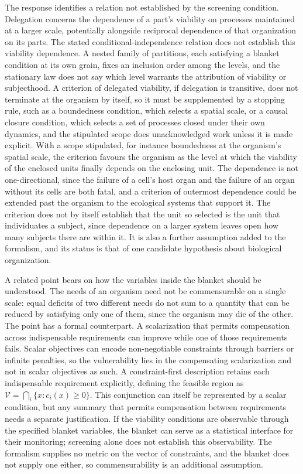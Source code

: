 \documentclass[11pt]{article}
\theoremstyle{definition}
\begin{document}
The response identifies a relation not established by the screening condition. Delegation concerns the dependence of a part's viability on processes maintained at a larger scale, potentially alongside reciprocal dependence of that organization on its parts. The stated conditional-independence relation does not establish this viability dependence. A nested family of partitions, each satisfying a blanket condition at its own grain, fixes an inclusion order among the levels, and the stationary law does not say which level warrants the attribution of viability or subjecthood. A criterion of delegated viability, if delegation is transitive, does not terminate at the organism by itself, so it must be supplemented by a stopping rule, such as a boundedness condition, which selects a spatial scale, or a causal closure condition, which selects a set of processes closed under their own dynamics, and the stipulated scope does unacknowledged work unless it is made explicit. With a scope stipulated, for instance boundedness at the organism's spatial scale, the criterion favours the organism as the level at which the viability of the enclosed units finally depends on the enclosing unit. The dependence is not one-directional, since the failure of a cell's host organ and the failure of an organ without its cells are both fatal, and a criterion of outermost dependence could be extended past the organism to the ecological systems that support it. The criterion does not by itself establish that the unit so selected is the unit that individuates a subject, since dependence on a larger system leaves open how many subjects there are within it. It is also a further assumption added to the formalism, and its status is that of one candidate hypothesis about biological organization.

A related point bears on how the variables inside the blanket should be understood. The needs of an organism need not be commensurable on a single scale: equal deficits of two different needs do not sum to a quantity that can be reduced by satisfying only one of them, since the organism may die of the other. The point has a formal counterpart. A scalarization that permits compensation across indispensable requirements can improve while one of those requirements fails. Scalar objectives can encode non-negotiable constraints through barriers or infinite penalties, so the vulnerability lies in the compensating scalarization and not in scalar objectives as such. A constraint-first description retains each indispensable requirement explicitly, defining the feasible region as $\mathcal V=\bigcap_i\{x:c_i(x)\geq 0\}$. This conjunction can itself be represented by a scalar condition, but any summary that permits compensation between requirements needs a separate justification. If the viability conditions are observable through the specified blanket variables, the blanket can serve as a statistical interface for their monitoring; screening alone does not establish this observability. The formalism supplies no metric on the vector of constraints, and the blanket does not supply one either, so commensurability is an additional assumption.
\end{document}
